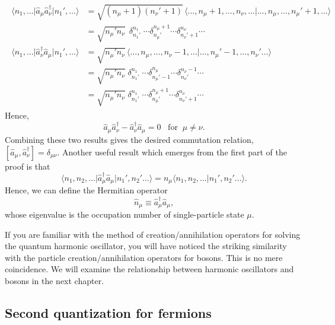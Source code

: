 \documentclass[pra,12pt]{revtex4}
\begin{document}
\begin{align*}
  \begin{aligned}\big\langle n_1, \dots \big| \hat{a}_\mu \hat{a}_\nu^\dagger \big| n_1', \dots\big\rangle &= \sqrt{(n_\mu+1)(n_\nu'+1)}\, \langle \dots, n_\mu+1, \dots, n_\nu, \dots | \dots, n_\mu, \dots, n_\mu'+1, \dots\rangle \\ &= \sqrt{n_\mu' n_\nu} \;\, \delta^{n_1}_{n_1'} \; \cdots \delta^{n_\mu+1}_{n_\mu'} \cdots \delta^{n_\nu}_{n_\nu' + 1}\cdots \\ \big\langle n_1, \dots \big| \hat{a}_\nu^\dagger \hat{a}_\mu \big| n_1', \dots\big\rangle &= \sqrt{n_\mu' n_\nu}\, \langle \dots, n_\mu, \dots,n_\nu-1,\dots | \dots, n_\mu'-1, \dots, n_\nu'\dots\rangle \\&= \sqrt{n_\mu' n_\nu} \;\delta^{n_1}_{n_1'} \; \cdots \delta^{n_\mu}_{n_\mu'-1}\cdots \delta^{n_\nu-1}_{n_\nu'} \cdots \\ &= \sqrt{n_\mu' n_\nu} \; \delta^{n_1}_{n_1'} \; \cdots \delta^{n_\mu+1}_{n_\mu'}\cdots \delta^{n_\nu}_{n_\nu'+1} \cdots\end{aligned}
\end{align*}
Hence,
\begin{equation}
  \hat{a}_\mu \hat{a}_\nu^\dagger - \hat{a}_\nu^\dagger \hat{a}_\mu = 0 \;\;\;\mathrm{for}\;\;\mu\ne\nu.
\end{equation}
Combining these two results gives the desired commutation relation,
$[\hat{a}_\mu, \hat{a}_\nu^\dagger] = \delta_{\mu\nu}$.  Another useful result which
emerges from the first part of the proof is that
\begin{equation}
  \big\langle n_1, n_2, \dots \big| \hat{a}_\mu^\dagger \hat{a}_\mu \big| n_1', n_2'\dots\big\rangle = n_\mu \big\langle n_1, n_2, \dots \big| n_1', n_2'\dots\big\rangle.
\end{equation}
Hence, we can define the Hermitian operator
\begin{equation}
  \hat{n}_\mu \equiv \hat{a}_\mu^\dagger \hat{a}_\mu,
\end{equation}
whose eigenvalue is the occupation number of single-particle state $\mu$.

If you are familiar with the method of creation/annihilation operators
for solving the quantum harmonic oscillator, you will have noticed the
striking similarity with the particle creation/annihilation operators
for bosons.  This is no mere coincidence.  We will examine the
relationship between harmonic oscillators and bosons in the next
chapter.

\subsection{Second quantization for fermions}
\label{sec:second_quantized_fermions}
\end{document}
